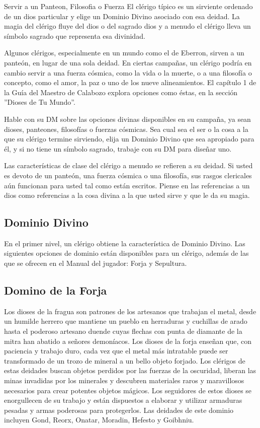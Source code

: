 \documentclass[a4paper,twocolumn,openany,10pt]{dndbook}
\begin{document}
\begin{paperbox}{Servir a un Panteon, Filosofia o Fuerza}
El clérigo típico es un sirviente ordenado de un dios particular y elige un Dominio Divino asociado con esa deidad. La magia del
clérigo fluye del dios o del sagrado dios y a menudo el clérigo lleva un símbolo sagrado que representa esa divinidad.

Algunos clérigos, especialmente en un mundo como el de Eberron, sirven a un panteón, en lugar de una sola deidad. En ciertas
campañas, un clérigo podría en cambio servir a una fuerza cósmica, como la vida o la muerte, o a una filosofía o concepto, como
el amor, la paz o uno de los nueve alineamientos. El capítulo 1 de la Guía del Maestro de Calabozo explora opciones como éstas,
en la sección ''Dioses de Tu Mundo''.

Hable con su DM sobre las opciones divinas disponibles en su campaña, ya sean dioses, panteones, filosofías o fuerzas cósmicas.
Sea cual sea el ser o la cosa a la que su clérigo termine sirviendo, elija un Dominio Divino que sea apropiado para él, y si no
tiene un símbolo sagrado, trabaje con su DM para diseñar uno.

Las características de clase del clérigo a menudo se refieren a su deidad. Si usted es devoto de un panteón, una fuerza cósmica
o una filosofía, sus rasgos clericales aún funcionan para usted tal como están escritos. Piense en las referencias a un dios
como referencias a la cosa divina a la que usted sirve y que le da su magia.  
\end{paperbox}

\subsection{Dominio Divino}
En el primer nivel, un clérigo obtiene la característica de Dominio Divino. Las siguientes opciones de dominio están disponibles para un
clérigo, además de las que se ofrecen en el Manual del jugador: Forja y Sepultura.  

\subsection{Domino de la Forja}
Los dioses de la fragua son patrones de los artesanos que trabajan el metal, desde un humilde herrero que mantiene un pueblo en
herraduras y cuchillas de arado hasta el poderoso artesano duende cuyas flechas con punta de diamante de la mitra han abatido a
señores demoníacos. Los dioses de la forja enseñan que, con paciencia y trabajo duro, cada vez que el metal más intratable
puede ser transformado de un trozo de mineral a un bello objeto forjado. Los clérigos de estas deidades buscan objetos perdidos
por las fuerzas de la oscuridad, liberan las minas invadidas por los minerales y descubren materiales raros y maravillosos
necesarios para crear potentes objetos mágicos. Los seguidores de estos dioses se enorgullecen de su trabajo y están dispuestos
a elaborar y utilizar armaduras pesadas y armas poderosas para protegerlos. Las deidades de este dominio incluyen Gond, Reorx,
Onatar, Moradin, Hefesto y Goibhniu.  
\end{document}

